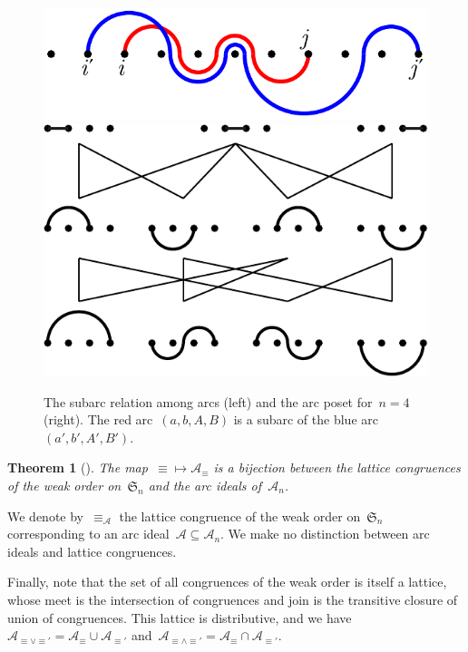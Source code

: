 \documentclass{amsart}
\newtheorem{theorem}{Theorem}[section]
\theoremstyle{definition}
\newcommand{\f}[1]{{\mathfrak{#1}}} %
\newcommand{\arcs}{{\mathcal{A}}} %
\newcommand{\meet}{\wedge} %
\newcommand{\join}{\vee} %
\begin{document}
\begin{figure}
	\capstart
	\centerline{\includegraphics[scale=.7,valign=c]{forcing} \hspace{1cm} \includegraphics[scale=.6,valign=c]{forcingOrder}}
	\caption{The subarc relation among arcs (left) and the arc poset for~$n = 4$ (right). The red arc~$(a,b,A,B)$ is a subarc of the blue arc~$(a',b',A',B')$. \mbox{\cite[Fig.~5]{PilaudSantos-quotientopes}}}
	\label{fig:forcingOrder}
\end{figure}

\begin{theorem}[{\cite[Thm.~4.4 \& Coro.~4.5]{Reading-arcDiagrams}}]
The map~${\equiv} \mapsto \arcs_\equiv$ is a bijection between the lattice congruences of the weak order on~$\f{S}_n$ and the arc ideals of~$\arcs_n$.
\end{theorem}

We denote by~$\equiv_\arcs$ the lattice congruence of the weak order on~$\f{S}_n$ corresponding to an arc ideal~$\arcs \subseteq \arcs_n$.
We make no distinction between arc ideals and lattice congruences.

Finally, note that the set of all congruences of the weak order is itself a lattice, whose meet is the intersection of congruences and join is the transitive closure of union of congruences.
This lattice is distributive, and we have~$\arcs_{{\equiv} \join {\equiv'}} = \arcs_\equiv \cup \arcs_{\equiv'}$ and~$\arcs_{{\equiv} \meet {\equiv'}} = \arcs_\equiv \cap \arcs_{\equiv'}$.
\end{document}
